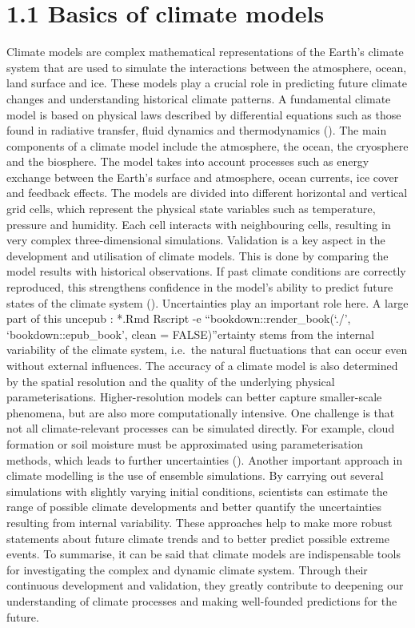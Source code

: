 \documentclass[
]{krantz}
\begin{document}
\section{1.1 Basics of climate models}\label{basics-of-climate-models}

Climate models are complex mathematical representations of the Earth's climate system that are used to simulate the interactions between the atmosphere, ocean, land surface and ice. These models play a crucial role in predicting future climate changes and understanding historical climate patterns. A fundamental climate model is based on physical laws described by differential equations such as those found in radiative transfer, fluid dynamics and thermodynamics (\citet{eyring2016overview}).
The main components of a climate model include the atmosphere, the ocean, the cryosphere and the biosphere. The model takes into account processes such as energy exchange between the Earth's surface and atmosphere, ocean currents, ice cover and feedback effects. The models are divided into different horizontal and vertical grid cells, which represent the physical state variables such as temperature, pressure and humidity. Each cell interacts with neighbouring cells, resulting in very complex three-dimensional simulations.
Validation is a key aspect in the development and utilisation of climate models. This is done by comparing the model results with historical observations. If past climate conditions are correctly reproduced, this strengthens confidence in the model's ability to predict future states of the climate system (\citet{eyring2016overview}). Uncertainties play an important role here. A large part of this uncepub : *.Rmd
Rscript -e ``bookdown::render\_book(`./', `bookdown::epub\_book', clean = FALSE)''ertainty stems from the internal variability of the climate system, i.e.~the natural fluctuations that can occur even without external influences.
The accuracy of a climate model is also determined by the spatial resolution and the quality of the underlying physical parameterisations. Higher-resolution models can better capture smaller-scale phenomena, but are also more computationally intensive. One challenge is that not all climate-relevant processes can be simulated directly. For example, cloud formation or soil moisture must be approximated using parameterisation methods, which leads to further uncertainties (\citet{eyring2016overview}).
Another important approach in climate modelling is the use of ensemble simulations. By carrying out several simulations with slightly varying initial conditions, scientists can estimate the range of possible climate developments and better quantify the uncertainties resulting from internal variability. These approaches help to make more robust statements about future climate trends and to better predict possible extreme events.
To summarise, it can be said that climate models are indispensable tools for investigating the complex and dynamic climate system. Through their continuous development and validation, they greatly contribute to deepening our understanding of climate processes and making well-founded predictions for the future.
\end{document}
